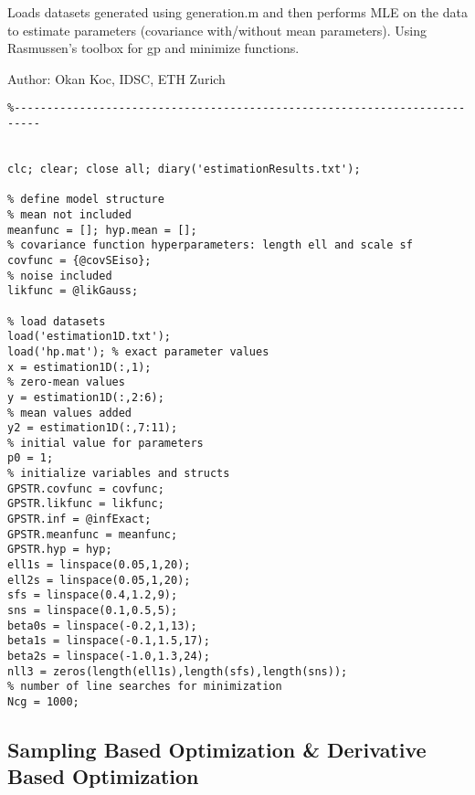\begin{par}
Loads datasets generated using generation.m and then performs MLE on the data to estimate parameters (covariance with/without mean parameters). Using Rasmussen's toolbox for gp and minimize functions.
\end{par} \vspace{1em}
\begin{par}
Author: Okan Koc, IDSC, ETH Zurich
\end{par} \vspace{1em}
\begin{verbatim}
%--------------------------------------------------------------------------


clc; clear; close all; diary('estimationResults.txt');

% define model structure
% mean not included
meanfunc = []; hyp.mean = [];
% covariance function hyperparameters: length ell and scale sf
covfunc = {@covSEiso};
% noise included
likfunc = @likGauss;

% load datasets
load('estimation1D.txt');
load('hp.mat'); % exact parameter values
x = estimation1D(:,1);
% zero-mean values
y = estimation1D(:,2:6);
% mean values added
y2 = estimation1D(:,7:11);
% initial value for parameters
p0 = 1;
% initialize variables and structs
GPSTR.covfunc = covfunc;
GPSTR.likfunc = likfunc;
GPSTR.inf = @infExact;
GPSTR.meanfunc = meanfunc;
GPSTR.hyp = hyp;
ell1s = linspace(0.05,1,20);
ell2s = linspace(0.05,1,20);
sfs = linspace(0.4,1.2,9);
sns = linspace(0.1,0.5,5);
beta0s = linspace(-0.2,1,13);
beta1s = linspace(-0.1,1.5,17);
beta2s = linspace(-1.0,1.3,24);
nll3 = zeros(length(ell1s),length(sfs),length(sns));
% number of line searches for minimization
Ncg = 1000;
\end{verbatim}


\subsection*{Sampling Based Optimization \& Derivative Based Optimization}


